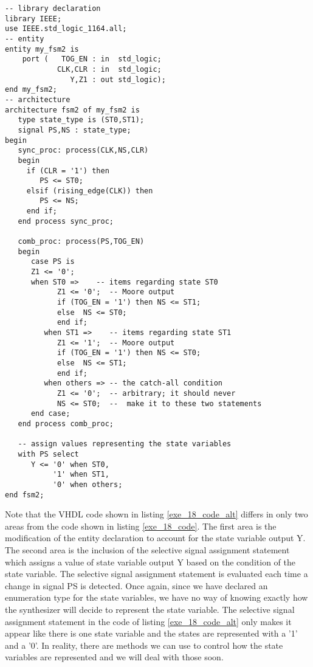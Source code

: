 \noindent
\begin{minipage}{0.99\linewidth}
\begin{lstlisting}[label=exe_18_code_alt, caption=Solution to Example 18 that include state variable as output.]
-- library declaration
library IEEE;
use IEEE.std_logic_1164.all;
-- entity
entity my_fsm2 is 
    port (   TOG_EN : in  std_logic; 
            CLK,CLR : in  std_logic; 
               Y,Z1 : out std_logic); 
end my_fsm2;
-- architecture
architecture fsm2 of my_fsm2 is
   type state_type is (ST0,ST1); 
   signal PS,NS : state_type; 
begin
   sync_proc: process(CLK,NS,CLR)
   begin
     if (CLR = '1') then 
        PS <= ST0; 
     elsif (rising_edge(CLK)) then 
        PS <= NS; 
     end if; 
   end process sync_proc; 

   comb_proc: process(PS,TOG_EN)
   begin
      case PS is 
      Z1 <= '0';    
      when ST0 =>    -- items regarding state ST0
            Z1 <= '0';  -- Moore output
            if (TOG_EN = '1') then NS <= ST1; 
            else  NS <= ST0; 
            end if; 
         when ST1 =>    -- items regarding state ST1
            Z1 <= '1';  -- Moore output
            if (TOG_EN = '1') then NS <= ST0; 
            else  NS <= ST1; 
            end if; 
         when others => -- the catch-all condition
            Z1 <= '0';  -- arbitrary; it should never 
            NS <= ST0;  --  make it to these two statements
      end case; 
   end process comb_proc; 
 
   -- assign values representing the state variables
   with PS select
      Y <= '0' when ST0, 
           '1' when ST1, 
           '0' when others; 
end fsm2;
\end{lstlisting}
\end{minipage}

Note that the VHDL code shown in listing \ref{exe_18_code_alt} differs in only two areas from the code shown in listing \ref{exe_18_code}. The first area is the modification of the entity declaration to account for the state variable output Y. The second area is the inclusion of the selective signal assignment statement which assigns a value of state variable output Y based on the condition of the state variable. The selective signal assignment statement is evaluated each time a change in signal PS is detected. Once again, since we have declared an enumeration type for the state variables, we have no way of knowing exactly how the synthesizer will decide to represent the state variable. The selective signal assignment statement in the code of listing \ref{exe_18_code_alt} only makes it appear like there is one state variable and the states are represented with a '1' and a '0'. In reality, there are methods we can use to control how the state variables are represented and we will deal with those soon. 

